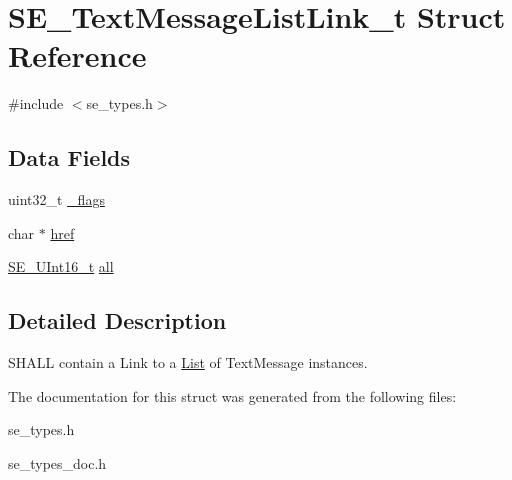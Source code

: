 \hypertarget{structSE__TextMessageListLink__t}{}\section{S\+E\+\_\+\+Text\+Message\+List\+Link\+\_\+t Struct Reference}
\label{structSE__TextMessageListLink__t}


{\ttfamily \#include $<$se\+\_\+types.\+h$>$}

\subsection*{Data Fields}
\begin{DoxyCompactItemize}
\item 
uint32\+\_\+t \hyperlink{group__TextMessageListLink_ga4c7b708274f34d0f2b39ba2e2c0c53f4}{\+\_\+flags}
\item 
char $\ast$ \hyperlink{group__TextMessageListLink_ga22a6b9bc1e90770e410f8c3e34bfa734}{href}
\item 
\hyperlink{group__UInt16_gac68d541f189538bfd30cfaa712d20d29}{S\+E\+\_\+\+U\+Int16\+\_\+t} \hyperlink{group__TextMessageListLink_ga5e20ed8e4656cb69f86839b6c5297f98}{all}
\end{DoxyCompactItemize}


\subsection{Detailed Description}
S\+H\+A\+LL contain a Link to a \hyperlink{structList}{List} of Text\+Message instances. 

The documentation for this struct was generated from the following files\+:\begin{DoxyCompactItemize}
\item 
se\+\_\+types.\+h\item 
se\+\_\+types\+\_\+doc.\+h\end{DoxyCompactItemize}
